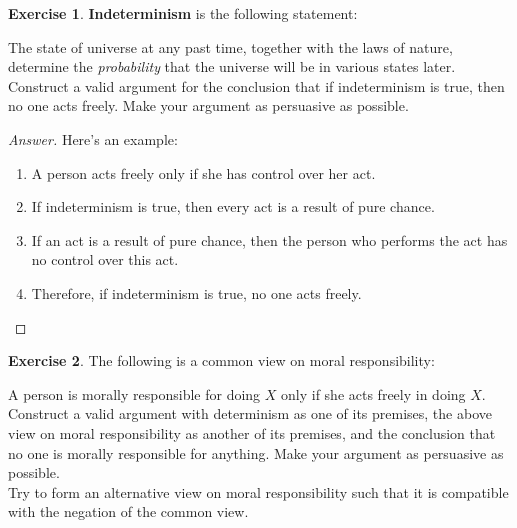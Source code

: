 \documentclass[11pt]{article}
\theoremstyle{definition}
\newtheorem{exer}{Exercise}
\begin{document}
\begin{exer}
\hfill

\noindent
\textbf{Indeterminism} is the following statement: 

The state of universe at any past time, together with the laws of nature, determine the \textit{probability} that the universe will be in various states later. \\

\noindent
Construct a valid argument for the conclusion that if indeterminism is true, then no one acts freely. Make your argument as persuasive as possible.

\end{exer}

\begin{proof}[Answer]
Here's an example:
\begin{enumerate}
\item A person acts freely only if she has control over her act.
\item If indeterminism is true, then every act is a result of pure chance.
\item If an act is a result of pure chance, then the person who performs the act has no control over this act.
\item Therefore, if indeterminism is true, no one acts freely.
\end{enumerate}

\end{proof}

\begin{exer}
\hfill

\noindent
The following is a common view on moral responsibility:

A person is morally responsible for doing $X$ only if she acts freely in doing $X$. \\

\noindent
Construct a valid argument with determinism as one of its premises, the above view on moral responsibility as another of its premises, and the conclusion that no one is morally responsible for anything. Make your argument as persuasive as possible. \\

\noindent
Try to form an alternative view on moral responsibility such that it is compatible with the negation of the common view.

\end{exer}
\end{document}
